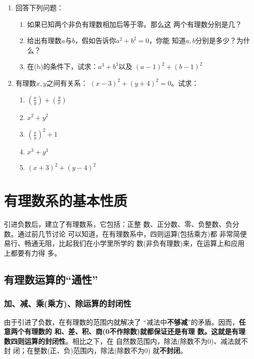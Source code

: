 \begin{enumerate}
\item  回答下列问题：
\begin{enumerate}
    \item 如果已知两个非负有理数相加后等于零。那么这
    两个有理数分别是几？
    \item 给出有理数$a$与$b$，假如告诉你$a^2 +b^2=0$，你能
    知道$a, b$分别是多少？为什么？
    \item 在(b)的条件下，试求：$a^3+b^3$以及
    $(a-1)^2+(b-1)^2$
\end{enumerate}


\item  有理数$x,  y$之间有关系：
$(x-3)^2+(y+4)^2=0$。试求：
\begin{multicols}{2}
    \begin{enumerate}
        \item $\left(\frac{x}{y}\right)+\left(\frac{y}{x}\right)$
        \item $x^2+y^2$
        \item $\left(\frac{x}{y}\right)^2+1$
        \item $x^3+y^3$
        \item $(x+3)^2+(y-4)^2$
    \end{enumerate}
\end{multicols}
\end{enumerate}

\section{有理数系的基本性质}
    引进负数后，建立了有理数系，它包括：正整
数、正分数、零、负整数、负分数。通过前几节讨论
可以知道，在有理数系中，四则运算(包括乘方)都
非常简便易行、畅通无阻，比起我们在小学里所学的
数(非负有理数)来，在运算上和应用上都要有力得
多。

\subsection{有理数运算的“通性”}
  \subsubsection{加、减、乘(乘方)、除运算的封闭性}
    由于引进了负数，在有理数的范围内就解决了
  “减法中\textbf{不够减}”的矛盾。因而，\textbf{任意两个有理数的
和、差、积、商(0不作除数)就都保证还是有理
数。这就是有理数四则运算的封闭性}。相比之下，在
自然数范围内，除法(除数不为0)、减法就不封
闭；在整数(正、负)范围内，除法(除数不为0)
就\textbf{不封闭}。

